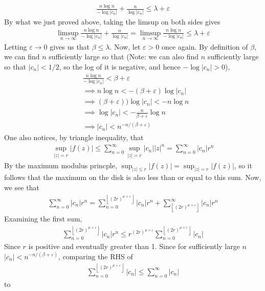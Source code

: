 \documentclass[12pt]{article}
\def \ve{\varepsilon}
\newcommand{\floor}[1]{\left\lfloor#1\right\rfloor}
\theoremstyle{definition}
\theoremstyle{remark}
\begin{document}
\begin{enumerate}[leftmargin=\labelsep]
	\begin{align*}
		\frac{n\log n}{-\log|c_n|} + \frac{n}{\log|c_n|} \leq \lambda + \ve
	\end{align*}
	By what we just proved above, taking the limsup on both sides gives
	\begin{align*}
		\limsup_{n \to \infty} \frac{n\log n}{-\log|c_n|} + \frac{n}{\log|c_n|} = \limsup_{n \to \infty} \frac{n\log n}{-\log|c_n|} \leq \lambda + \ve
	\end{align*}	
	Letting $\ve \to 0$ gives us that $\beta \leq \lambda$. Now, let $\ve > 0$ once again. By definition of $\beta$, we can find $n$ sufficiently large so that (Note: we can also find $n$ sufficiently large so that $|c_n| < 1/2$, so the log of it is negative, and hence $-\log|c_n| > 0$),
	\begin{align*}
		&\frac{n\log n}{-\log|c_n|} < \beta + \ve \\
		&\implies n\log n < -(\beta+\ve)\log|c_n| \\
		&\implies (\beta+\ve)) \log|c_n| < -n\log n \\
		&\implies \log|c_n| < -\frac{n}{\beta + \ve} \log n \\
		&\implies |c_n| < n^{-n/(\beta+\ve)}
	\end{align*}
	One also notices, by triangle inequality, that
	\begin{align*}
		\sup_{|z| = r} |f(z)| \leq \sum_{n=0}^\infty \sup_{|z| = r} |c_n||z|^n = \sum_{n=0}^\infty |c_n|r^n
	\end{align*}
	By the maximum modulus princple, $\sup_{|z| \leq r} |f(z)| = \sup_{|z| = r} |f(z)|$, so it follows that the maximum on the disk is also less than or equal to this sum. Now, we see that
	\begin{align*}
		\sum_{n=0}^\infty |c_n|r^n = \sum_{n = 0}^{\floor{(2r)^{\mu + \ve}}} |c_n|r^n + \sum_{\floor{(2r)^{\mu + \ve}}}^\infty |c_n|r^n
	\end{align*}
	Examining the first sum, 
	 \begin{align*}
	 	\sum_{n = 0}^{\floor{(2r)^{\mu + \ve}}} |c_n|r^n  \leq r^{(2r)^{\mu + \ve}} \sum_{n = 0}^{\floor{(2r)^{\mu + \ve}}} |c_n|
	 \end{align*}
 	Since $r$ is positive and eventually greater than 1. Since for sufficiently large $n$ $|c_n| < n^{-n/(\beta + \ve)}$, comparing the RHS of 
 	\begin{align*}
 		\sum_{n=0}^{\floor{(2r)^{\mu + \ve}}} |c_n| \leq \sum_{n=0}^{\infty} |c_n|
 	\end{align*}
 	to 
 	\begin{align*}

\end{align*}
\end{enumerate}
\end{document}
